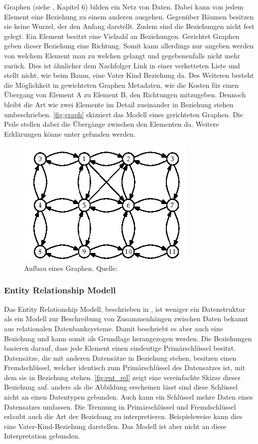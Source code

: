 \documentclass[a4paper]{article}
\begin{document}
	Graphen (siehe \cite{FundData}, Kapitel 6) bilden ein Netz von Daten. Dabei
	kann von jedem Element eine Beziehung zu einem anderen ausgehen. Gegenüber
	Bäumen besitzen sie keine Wurzel, der den Anfang darstellt. Zudem sind die
	Beziehungen nicht fest gelegt. Ein Element besitzt eine Vielzahl an
	Beziehungen. Gerichtet Graphen geben dieser Beziehung eine Richtung.
	Somit kann allerdings nur angeben werden von welchem Element man zu welchen
	gelangt und gegebenenfalls nicht mehr zurück. Dies ist ähnlicher dem 
	Nachfolger Link in einer verketteten Liste und stellt nicht,
	wie beim Baum, eine Vater Kind Beziehung da. Des Weiteren besteht die
	Möglichkeit in gewichteten Graphen Metadaten, wie die Kosten für einen
	Übergang von Element A zu Element B, den Richtungen mitzugeben. Dennoch bleibt
	die Art wie zwei Elemente im Detail zueinander in Beziehung stehen	
	umbeschrieben. \autoref{fig:graph} skizziert das Modell eines gerichteten
	Graphen. Die Peile stellen dabei die Übergänge zwischen den Elementen da.
	Weitere Erklärungen könne unter \cite{Graph} gefunden werden. 

	\begin{figure}[H] 
		\centerline{
			\includegraphics{../Bilder/graph.jpg}
		}
		\caption{Aufbau eines Graphen. Quelle: \cite{Graph}}
		\label{fig:graph}
	\end{figure}
	
	\subsubsection{Entity Relationship Modell}
	
	Das Entity Relationship Modell, beschrieben in \cite{EntRel}, ist weniger
	ein Datenstruktur als ein Modell zur Beschreibung von Zusammenhängen zwischen
	Daten bekannt aus relationalen Datenbanksysteme. Damit beschriebt es aber
	auch eine Beziehung und kann somit als Grundlage herangezogen werden. Die
	Beziehungen basieren darauf, dass jede Element einen eindeutige 
	Primärschlüssel besitzt. Datensätze, die mit anderen Datensätze in Beziehung 
	stehen, besitzen einen Fremdschlüssel, welcher identisch zum Primärschlüssel
	des Datensatzes ist, mit dem sie in Beziehung stehen. \autoref{fig:ent_rel}
	zeigt eine vereinfachte Skizze dieser Beziehung auf. anders als die Abbildung
	erscheinen lässt sind diese Schlüssel nicht an einen Datentypen gebunden. Auch
	kann ein Schlüssel mehre Daten eines Datensatzes umfassen. Die Trennung
	in Primärschlüssel und Fremdschlüssel erlaubt auch die Art der Beziehung zu
	interpretieren. Beispielsweise kann dies eine Vater-Kind-Beziehung darstellen.
	Das Modell ist aber nicht an diese Interpretation gebunden.
	
\end{document}
